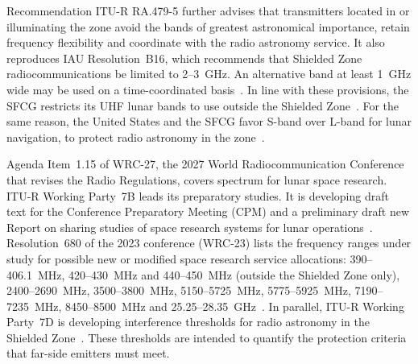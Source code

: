 \documentclass{IEEEoj}
\begin{document}
Recommendation ITU-R RA.479-5 further advises that transmitters located in or illuminating the zone avoid the bands of greatest astronomical importance, retain frequency flexibility and coordinate with the radio astronomy service. It also reproduces IAU Resolution~B16, which recommends that Shielded Zone radiocommunications be limited to \SI{2}{}--\SI{3}{GHz}. An alternative band at least \SI{1}{GHz} wide may be used on a time-coordinated basis~\cite{itu_ra479}. In line with these provisions, the SFCG restricts its UHF lunar bands to use outside the Shielded Zone~\cite{sfcg_rec32}. For the same reason, the United States and the SFCG favor S-band over L-band for lunar navigation, to protect radio astronomy in the zone~\cite{csis_lunar_spectrum}.

Agenda Item~1.15 of WRC-27, the 2027 World Radiocommunication Conference that revises the Radio Regulations, covers spectrum for lunar space research. ITU-R Working Party~7B leads its preparatory studies. It is developing draft text for the Conference Preparatory Meeting (CPM) and a preliminary draft new Report on sharing studies of space research systems for lunar operations~\cite{wrc27_ai115}. Resolution~680 of the 2023 conference (WRC-23) lists the frequency ranges under study for possible new or modified space research service allocations: \SI{390}{}--\SI{406.1}{MHz}, \SI{420}{}--\SI{430}{MHz} and \SI{440}{}--\SI{450}{MHz} (outside the Shielded Zone only), \SI{2400}{}--\SI{2690}{MHz}, \SI{3500}{}--\SI{3800}{MHz}, \SI{5150}{}--\SI{5725}{MHz}, \SI{5775}{}--\SI{5925}{MHz}, \SI{7190}{}--\SI{7235}{MHz}, \SI{8450}{}--\SI{8500}{MHz} and \SI{25.25}{}--\SI{28.35}{GHz}~\cite{itu_wrc23_res680}. In parallel, ITU-R Working Party~7D is developing interference thresholds for radio astronomy in the Shielded Zone~\cite{itu_szm_thresholds}. These thresholds are intended to quantify the protection criteria that far-side emitters must meet.
\end{document}
